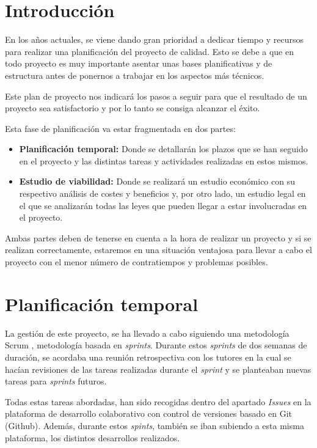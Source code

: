 
\section{Introducción}
En los años actuales, se viene dando gran prioridad a dedicar tiempo y recursos para realizar una  planificación del proyecto de calidad. Esto se debe a que en todo proyecto es muy importante asentar unas bases planificativas y de estructura antes de ponernos a trabajar en los aspectos más técnicos.

Este plan de proyecto nos indicará los pasos a seguir para que el resultado de un proyecto sea satisfactorio y por lo tanto se consiga alcanzar el éxito.

Esta fase de planificación va estar fragmentada en dos partes:
\begin{itemize}
\item 
\textbf{Planificación temporal: } Donde se detallarán los plazos que se han seguido en el proyecto y las distintas tareas y actividades realizadas en estos mismos.
\item 
\textbf{Estudio de viabilidad: } Donde se realizará un estudio económico con su respectivo análisis de costes y beneficios y, por otro lado, un estudio legal en el que se analizarán todas las leyes que pueden llegar a estar involucradas en el proyecto.
\end{itemize}

Ambas partes deben de tenerse en cuenta a la hora de realizar un proyecto y si se realizan correctamente, estaremos en una situación ventajosa para llevar a cabo el proyecto con el menor número de contratiempos y problemas posibles. 
\section{Planificación temporal}
La gestión de este proyecto, se ha llevado a cabo siguiendo una metodología Scrum \cite{scrum:latex}, metodología basada en \textit{sprints}. Durante estos \textit{sprints} de dos semanas de duración, se acordaba una reunión retrospectiva con los tutores en la cual se hacían revisiones de las tareas realizadas durante el \textit{sprint} y se planteaban nuevas tareas para \textit{sprints} futuros.

Todas estas tareas abordadas, han sido recogidas dentro del apartado \textit{Issues} en la plataforma de desarrollo colaborativo con control de versiones basado en Git (Github). Además, durante estos \textit{spints}, también se iban subiendo a esta misma plataforma, los distintos desarrollos realizados.

